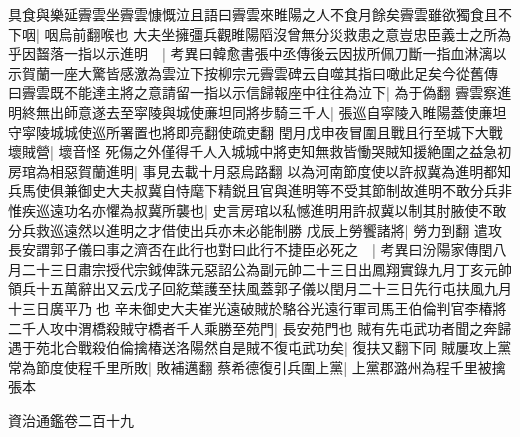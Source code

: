 具食與樂延霽雲坐霽雲慷慨泣且語曰霽雲來睢陽之人不食月餘矣霽雲雖欲獨食且不下咽|{
	咽烏前翻喉也}
大夫坐擁彊兵觀睢陽䧟沒曾無分災救患之意豈忠臣義士之所為乎因齧落一指以示進明　|{
	考異曰韓愈書張中丞傳後云因拔所佩刀斷一指血淋漓以示賀蘭一座大驚皆感激為雲泣下按柳宗元霽雲碑云自噬其指曰噉此足矣今從舊傳}
曰霽雲既不能達主將之意請留一指以示信歸報座中往往為泣下|{
	為于偽翻}
霽雲察進明終無出師意遂去至寜陵與城使亷坦同將步騎三千人|{
	張巡自寜陵入睢陽蓋使亷坦守寜陵城城使巡所署置也將即亮翻使疏吏翻}
閏月戊申夜冒圍且戰且行至城下大戰壞賊營|{
	壞音怪}
死傷之外僅得千人入城城中將吏知無救皆慟哭賊知援絶圍之益急初房琯為相惡賀蘭進明|{
	事見去載十月惡烏路翻}
以為河南節度使以許叔冀為進明都知兵馬使俱兼御史大夫叔冀自恃麾下精鋭且官與進明等不受其節制故進明不敢分兵非惟疾巡遠功名亦懼為叔冀所襲也|{
	史言房琯以私憾進明用許叔冀以制其肘腋使不敢分兵救巡遠然以進明之才借使出兵亦未必能制勝}
戊辰上勞饗諸將|{
	勞力到翻}
遣攻長安謂郭子儀曰事之濟否在此行也對曰此行不捷臣必死之　|{
	考異曰汾陽家傳閏八月二十三日肅宗授代宗鉞俾誅元惡詔公為副元帥二十三日出鳳翔實錄九月丁亥元帥領兵十五萬辭出又云戊子回紇葉護至扶風蓋郭子儀以閏月二十三日先行屯扶風九月十三日廣平乃也}
辛未御史大夫崔光遠破賊於駱谷光遠行軍司馬王伯倫判官李椿將二千人攻中渭橋殺賊守橋者千人乘勝至苑門|{
	長安苑門也}
賊有先屯武功者聞之奔歸遇于苑北合戰殺伯倫擒椿送洛陽然自是賊不復屯武功矣|{
	復扶又翻下同}
賊屢攻上黨常為節度使程千里所敗|{
	敗補邁翻}
蔡希德復引兵圍上黨|{
	上黨郡潞州為程千里被擒張本}


資治通鑑卷二百十九
